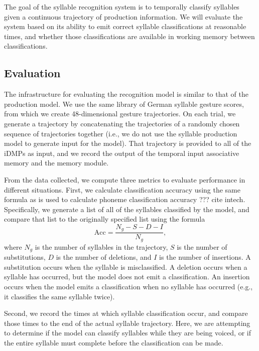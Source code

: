 The goal of the syllable recognition system
is to temporally classify syllables
given a continuous trajectory
of production information.
We will evaluate the system
based on its ability to emit
correct syllable classifications
at reasonable times,
and whether those classifications
are available in working memory
between classifications.

\subsection{Evaluation}

The infrastructure for evaluating
the recognition model
is similar to that of the production model.
We use the same library
of German syllable gesture scores,
from which we create
48-dimensional gesture trajectories.
On each trial,
we generate a trajectory
by concatenating the trajectories
of a randomly chosen sequence
of trajectories together
(i.e., we do not use the
syllable production model
to generate input for the model).
That trajectory is provided
to all of the iDMPs as input,
and we record the output of the
temporal input associative memory
and the memory module.

From the data collected,
we compute three metrics
to evaluate performance
in different situations.
First, we calculate
classification accuracy
using the same formula
as is used to calculate
phoneme classification accuracy ??? cite intech.
Specifically,
we generate a list of all of the
syllables classified by the model,
and compare that list to the
originally specified list
using the formula
\begin{equation}
  \text{Acc} = \frac{N_g - S - D - I}{N_g},
\end{equation}
where $N_g$ is the number of syllables
in the trajectory,
$S$ is the number of substitutions,
$D$ is the number of deletions,
and $I$ is the number of insertions.
A substitution occurs when
the syllable is misclassified.
A deletion occurs when
a syllable has occurred,
but the model does not emit a classification.
An insertion occurs
when the model emits a classification
when no syllable has occurred
(e.g., it classifies the same syllable twice).

Second, we record the times at which
syllable classification occur,
and compare those times
to the end of the actual syllable trajectory.
Here, we are attempting to determine
if the model can classify syllables
while they are being voiced,
or if the entire syllable must complete
before the classification can be made.

